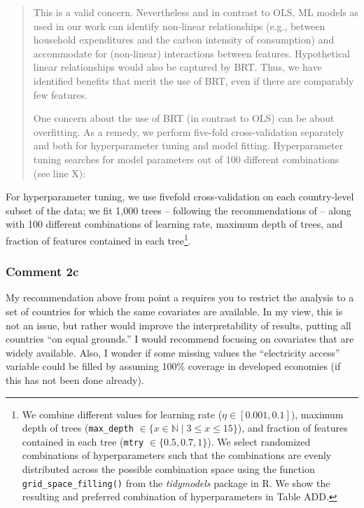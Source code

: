 \documentclass[11pt]{article}
\newenvironment{response}
{\begin{quote}\color{black}}
{\end{quote}}
\begin{document}
\begin{response}
    This is a valid concern. Nevertheless and in contrast to OLS, ML models as used in our work can identify non-linear relationships (e.g., between household expenditures and the carbon intensity of consumption) and accommodate for (non-linear) interactions between features. Hypothetical linear relationships would also be captured by BRT. Thus, we have identified benefits that merit the use of BRT, even if there are comparably few features.

    One concern about the use of BRT (in contrast to OLS) can be about overfitting. As a remedy, we perform five-fold cross-validation separately and both for hyperparameter tuning and model fitting. Hyperparameter tuning searches for model parameters out of 100 different combinations (see line X):
\end{response}

\begin{revisionbox}
    For hyperparameter tuning, we use fivefold cross-validation on each country-level subset of the data; we fit 1,000 trees -- following the recommendations of \textcite{Elith.2008} -- along with 100 different combinations of learning rate, maximum depth of trees, and fraction of features contained in each tree\footnote{We combine different values for learning rate ($\eta \in [0.001,0.1]$), maximum depth of trees (\texttt{max\_depth} $\in \{x \in \mathbb{N} \mid 3  \leq x \leq 15 \}$), and fraction of features contained in each tree (\texttt{mtry} $\in \{0.5,0.7,1\}$). We select randomized combinations of hyperparameters such that the combinations are evenly distributed across the possible combination space using the function \texttt{grid\_space\_filling()} from the \textit{tidymodels} package in R. We show the resulting and preferred combination of hyperparameters in Table ADD.}.
\end{revisionbox}

\subsubsection*{Comment 2c}\label{comment_R2_2c}

\begin{commentbox}
    My recommendation above from point a requires you to restrict the analysis to a set of countries for which the same covariates are available. In my view, this is not an issue, but rather would improve the interpretability of results, putting all countries “on equal grounds.” I would recommend focusing on covariates that are widely available. Also, I wonder if some missing values the “electricity access” variable could be filled by assuming 100\% coverage in developed economies (if this has not been done already).
\end{commentbox}
\end{document}
